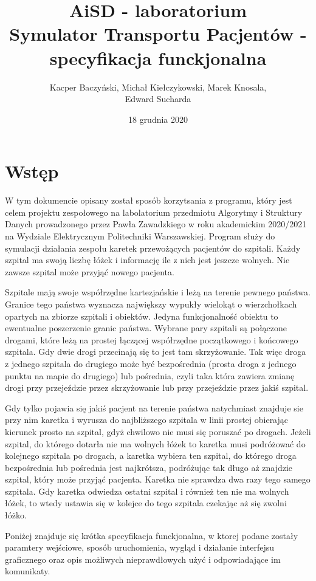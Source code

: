 \documentclass[10pt,a4paper]{article}
\title{\huge AiSD - laboratorium \\ \Large Symulator Transportu Pacjentów - specyfikacja funckjonalna}
\author{Kacper Baczyński, Michał Kiełczykowski, Marek Knosala, \\ Edward Sucharda}
\begin{document}
\date{18 grudnia 2020}

\maketitle


\section{Wstęp}

W tym dokumencie opisany został sposób korzytsania z programu, który jest celem projektu zespołowego na labolatorium przedmiotu Algorytmy i Struktury Danych prowadzonego przez Pawła Zawadzkiego w roku akademickim 2020/2021 na Wydziale Elektrycznym Politechniki Warszawskiej. Program służy do symulacji działania zespołu karetek przewożących pacjentów do szpitali. Każdy szpital ma swoją liczbę łóżek i informację ile z nich jest jeszcze wolnych. Nie zawsze szpital może przyjąć nowego pacjenta.

Szpitale mają swoje współrzędne kartezjańskie i leżą na terenie pewnego państwa. Granice tego państwa wyznacza największy wypukły wielokąt o wierzchołkach opartych na zbiorze szpitali i obiektów. Jedyna funkcjonalność obiektu to ewentualne poszerzenie granic państwa. Wybrane pary szpitali są połączone drogami, które leżą na prostej łączącej współrzędne początkowego i końcowego szpitala. Gdy dwie drogi przecinają się to jest tam skrzyżowanie. Tak więc droga z jednego szpitala do drugiego może być bezpośrednia (prosta droga z jednego punktu na mapie do drugiego) lub pośrednia, czyli taka która zawiera zmianę drogi przy przejeździe przez skrzyżowanie lub przy przejeździe przez jakiś szpital.

Gdy tylko pojawia się jakiś pacjent na terenie państwa natychmiast znajduje sie przy nim karetka i wyrusza do najbliższego szpitala w linii prostej obierając kierunek prosto na szpital, gdyż chwilowo nie musi się poruszać po drogach. Jeżeli szpital, do którego dotarła nie ma wolnych łóżek to karetka musi podróżować do kolejnego szpitala po drogach, a karetka wybiera ten szpital, do którego droga bezpośrednia lub pośrednia jest najkrótsza, podróżując tak długo aż znajdzie szpital, który może przyjąć pacjenta. Karetka nie sprawdza dwa razy tego samego szpitala. Gdy karetka odwiedza ostatni szpital i również ten nie ma wolnych łóżek, to wtedy ustawia się w kolejce do tego szpitala czekając aż się zwolni łóżko.

Poniżej znajduje się krótka specyfikacja funckjonalna, w ktorej podane zostały paramtery wejściowe, sposób uruchomienia, wygląd i działanie interfejsu graficznego oraz opis możliwych nieprawdłowych użyć i odpowiadające im komunikaty.
\end{document}
